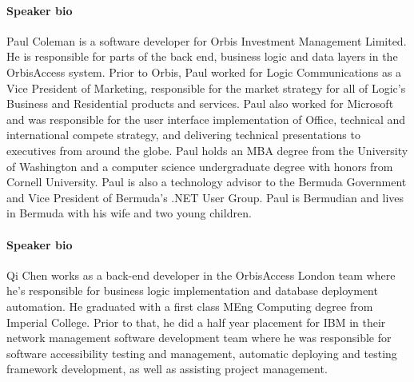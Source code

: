 \documentclass{article}
\begin{document}
\paragraph{Speaker bio}
Paul Coleman is a software developer for Orbis Investment Management
Limited.  He is responsible for parts of the back end, business logic
and data layers in the OrbisAccess system.
%
Prior to Orbis, Paul worked for Logic Communications as a Vice President
of Marketing, responsible for the market strategy for all of Logic's
Business and Residential products and services.
%
Paul also worked for Microsoft and was responsible for the user
interface implementation of Office, technical and international
compete strategy, and delivering technical presentations to executives
from around the globe.
%
Paul holds an MBA degree from the University of Washington and a
computer science undergraduate degree with honors from Cornell
University.  Paul is also a technology advisor to the Bermuda
Government and Vice President of Bermuda's .NET User Group.
%
Paul is Bermudian and lives in Bermuda with his wife and two young children.

\paragraph{Speaker bio} 
Qi Chen works as a back-end developer in the OrbisAccess London team
where he's responsible for business logic implementation and database
deployment automation.
%
He graduated with a first class MEng Computing degree from Imperial
College.
%
Prior to that, he did a half year placement for IBM in their network
management software development team where he was responsible for
software accessibility testing and management, automatic deploying and
testing framework development, as well as assisting project
management.
\end{document}
